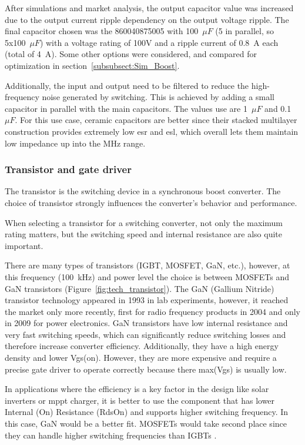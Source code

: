     After simulations and market analysis, the output capacitor value was increased due to the output current ripple dependency on the output voltage ripple. The final capacitor chosen was the 860040875005 with 100~$\mu F$  (5 in parallel, so 5x100~$\mu F$) with a voltage rating of 100V and a ripple current of 0.8~A each (total of 4~A). Some other options were considered, and compared for optimization in section~\ref{subsubsect:Sim_Boost}. 

    Additionally, the input and output need to be filtered to reduce the high-frequency noise generated by switching. This is achieved by adding a small capacitor in parallel with the main capacitors. The values use are 1~$\mu F$ and 0.1~$\mu F$. For this use case, ceramic capacitors are better since their stacked multilayer construction provides extremely low \ac{esr} and \ac{esl}, which overall lets them maintain low impedance up into the MHz range.

\subsubsection{Transistor and gate driver}
    The transistor is the switching device in a synchronous boost converter. The choice of transistor strongly influences the converter's behavior and performance.

    When selecting a transistor for a switching converter, not only the maximum rating matters, but the switching speed and internal resistance are also quite important. 
    
    There are many types of transistors (IGBT, MOSFET,  GaN, etc.), however, at this frequency (100~kHz) and power level the choice is between MOSFETs and GaN transistors (Figure~\ref{fig:tech_transistor}). The GaN (Gallium Nitride) transistor technology appeared in 1993 in lab experiments, however, it reached the market only more recently, first for radio frequency products in 2004 and only in 2009 for power electronics. GaN transistors have low internal resistance and very fast switching speeds, which can significantly reduce switching losses and therefore increase converter efficiency. Additionally, they have a high energy density and lower Vgs(on). However, they are more expensive and require a precise gate driver to operate correctly because there max(Vgs) is usually low. 

    In applications where the efficiency is a key factor in the design like solar inverters or \ac{mppt} charger, it is better to use the component that has lower Internal (On) Resistance (RdsOn) and supports higher switching frequency. In this case, GaN would be a better fit. MOSFETs would take second place since they can handle higher switching frequencies than IGBTs \cite{talat2024igbt}.

